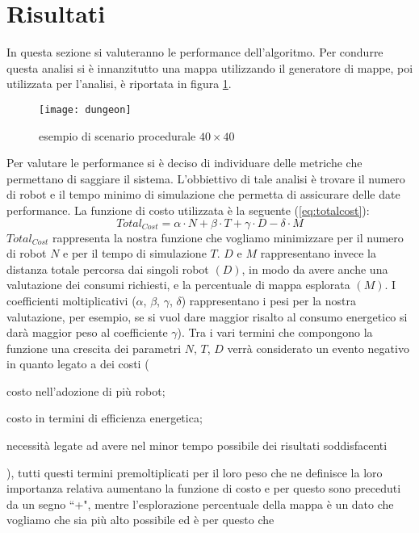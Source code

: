 \section{Risultati}
\label{sec:risultati}
In questa sezione si valuteranno le performance dell'algoritmo.
Per condurre questa analisi si è innanzitutto una mappa utilizzando il generatore
di mappe, poi utilizzata per l'analisi, è riportata in figura \ref{fig:dungeon}.
\begin{figure}[!htb]
	\centering
	\texttt{[image: dungeon]}
	\caption{esempio di scenario procedurale $40\times40$}
\label{fig:dungeon}
\end{figure}
%
Per valutare le performance si è deciso di individuare delle metriche che
permettano di saggiare il sistema.
L'obbiettivo di tale analisi è trovare il numero di robot e il tempo minimo di
simulazione che permetta di assicurare delle date performance.
La funzione di costo utilizzata è la seguente (\ref{eq:totalcost}):
\begin{equation}
	\label{eq:totalcost}
	Total_{Cost} = \alpha \cdot N +\beta \cdot T + \gamma \cdot D - \delta \cdot M
\end{equation}
$Total_{Cost}$ rappresenta la nostra funzione che vogliamo minimizzare per il
numero di robot $N$ e per il tempo di simulazione $T$. $D$ e $M$ rappresentano
invece la distanza totale percorsa dai singoli robot $(D)$, in modo da avere
anche una valutazione dei consumi richiesti, e la percentuale di mappa esplorata
$(M)$.
I coefficienti moltiplicativi ($\alpha$, $\beta$, $\gamma$, $\delta$)
rappresentano i pesi per la nostra valutazione, per esempio, se si vuol dare
maggior risalto al consumo energetico si darà maggior peso al coefficiente
$\gamma$).
Tra i vari termini che compongono la funzione una crescita dei parametri $N$,
$T$, $D$ verrà considerato un evento negativo in quanto legato a dei costi (
\begin{enumerate*}[label={\alph*)},font={\bfseries}]
\item costo nell'adozione di più robot;
\item costo in termini di efficienza energetica;
\item necessità legate ad avere nel minor tempo possibile dei risultati 
soddisfacenti
\end{enumerate*}), tutti questi termini premoltiplicati per il loro peso che ne 
definisce la loro importanza relativa aumentano la funzione di costo e per 
questo sono preceduti da un segno ``+", mentre l'esplorazione percentuale della
mappa è un dato che vogliamo che sia più alto possibile ed è per questo che 
